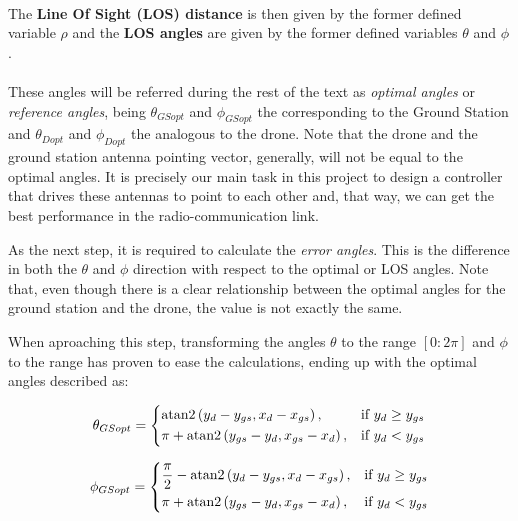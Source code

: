 \paragraph{} The \textbf{Line Of Sight (LOS) distance} is then given by the former defined variable $\rho$ and the \textbf{LOS angles} are given by the former defined variables $\theta$ and $\phi$.
\paragraph{} These angles will be referred during the rest of the text as \textit{optimal angles} or \textit{reference angles}, being $\theta_{GSopt}$ and $\phi_{GSopt}$ the corresponding to the Ground Station and $\theta_{Dopt}$ and $\phi_{Dopt}$ the analogous to the drone.
Note that the drone and the ground station antenna pointing vector, generally, will not be equal to the optimal angles. It is precisely our main task in this project to design a controller that drives these antennas to point to each other and, that way, we can get the best performance in the radio-communication link.


\begin{figure}[H]
   \centering
     
    \label{fig:OptimalAngles1}
\end{figure}

\begin{figure}[H]
   \centering
     
    \label{fig:OptimalAngles1}  
\end{figure}


As the next step, it is required to calculate the \textit{error angles}. This is the difference in both the $\theta$ and $\phi$ direction with respect to the optimal or LOS angles.
Note that, even though there is a clear relationship between the optimal angles for the ground station and the drone, the value is not exactly the same.

When aproaching this step, transforming the angles $\theta$ to the range $[0:2\pi]$ and $\phi$ to the range has proven to ease the calculations, ending up with the optimal angles described as:

\begin{equation}
  \theta_{GSopt}=
  \begin{dcases}
    {\rm atan2}\left(y_{d}-y_{gs}, x_{d}-x_{gs}\right), & \text{if } y_{d}\geq y_{gs}\\
    \pi + {\rm atan2}\left(y_{gs}-y_{d}, x_{gs}-x_{d}\right), & \text{if } y_{d} < y_{gs}
  \end{dcases}
\end{equation}

\begin{equation*}
  \phi_{GSopt}= 
  \begin{dcases}
    \dfrac{\pi}{2} - {\rm atan2}\left(y_{d}-y_{gs}, x_{d}-x_{gs}\right),      & \text{if } y_{d}\geq y_{gs}\\
    \pi + {\rm atan2}\left(y_{gs}-y_{d}, x_{gs}-x_{d}\right), & \text{if } y_{d} < y_{gs}
    \label{eq1:thetaGS}
  \end{dcases}
\end{equation*}